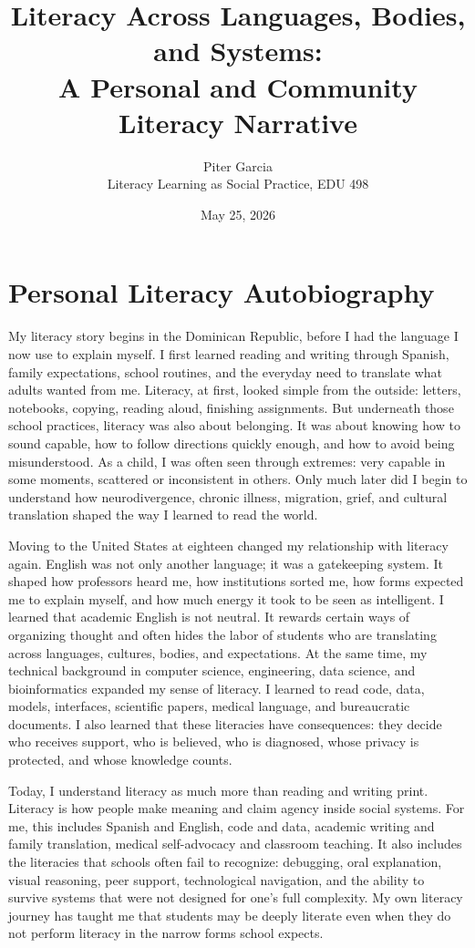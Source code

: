 \documentclass[11pt]{article}
\title{Literacy Across Languages, Bodies, and Systems:\\A Personal and Community Literacy Narrative}
\author{Piter Garcia\\Literacy Learning as Social Practice, EDU 498}
\date{May 25, 2026}
\begin{document}
\maketitle
\thispagestyle{fancy}

\section*{Personal Literacy Autobiography}

My literacy story begins in the Dominican Republic, before I had the language I now use to explain myself. I first learned reading and writing through Spanish, family expectations, school routines, and the everyday need to translate what adults wanted from me. Literacy, at first, looked simple from the outside: letters, notebooks, copying, reading aloud, finishing assignments. But underneath those school practices, literacy was also about belonging. It was about knowing how to sound capable, how to follow directions quickly enough, and how to avoid being misunderstood. As a child, I was often seen through extremes: very capable in some moments, scattered or inconsistent in others. Only much later did I begin to understand how neurodivergence, chronic illness, migration, grief, and cultural translation shaped the way I learned to read the world.

Moving to the United States at eighteen changed my relationship with literacy again. English was not only another language; it was a gatekeeping system. It shaped how professors heard me, how institutions sorted me, how forms expected me to explain myself, and how much energy it took to be seen as intelligent. I learned that academic English is not neutral. It rewards certain ways of organizing thought and often hides the labor of students who are translating across languages, cultures, bodies, and expectations. At the same time, my technical background in computer science, engineering, data science, and bioinformatics expanded my sense of literacy. I learned to read code, data, models, interfaces, scientific papers, medical language, and bureaucratic documents. I also learned that these literacies have consequences: they decide who receives support, who is believed, who is diagnosed, whose privacy is protected, and whose knowledge counts.

Today, I understand literacy as much more than reading and writing print. Literacy is how people make meaning and claim agency inside social systems. For me, this includes Spanish and English, code and data, academic writing and family translation, medical self-advocacy and classroom teaching. It also includes the literacies that schools often fail to recognize: debugging, oral explanation, visual reasoning, peer support, technological navigation, and the ability to survive systems that were not designed for one's full complexity. My own literacy journey has taught me that students may be deeply literate even when they do not perform literacy in the narrow forms school expects.
\end{document}

